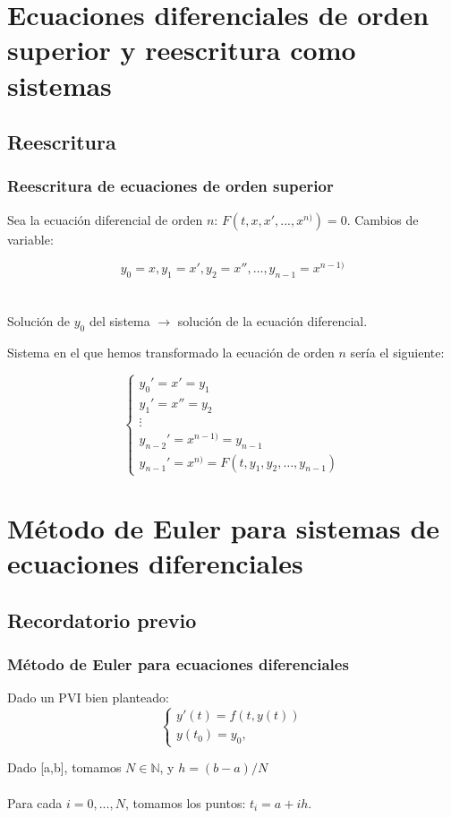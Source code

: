 \documentclass{beamer}
\begin{document}
\section{Ecuaciones diferenciales de orden superior y reescritura como sistemas}
\subsection{Reescritura}
\begin{frame}
	\frametitle{Reescritura de ecuaciones de orden superior}

	Sea la ecuación diferencial de orden $n$: $ F(t, x, x', ..., x^{n)}) = 0 $. Cambios de variable:

	$$y_0 = x, y_1 = x', y_2 = x'', \dots, y_{n-1} = x^{n-1)}$$\\~\\

	Solución de $y_0$ del sistema $\rightarrow$ solución de la ecuación diferencial.

\end{frame}

\begin{frame}
	
	Sistema en el que hemos transformado la ecuación de orden $n$ sería el siguiente:
	
	$$
	\begin{cases}
	y_0' = x' = y_1\\
	y_1' = x'' = y_2\\
	\vdots\\
	y_{n-2}' = x^{n-1)} = y_{n-1}\\
	y_{n-1}' = x^{n)} = F(t, y_1, y_2, \dots, y_{n-1})
	\end{cases}
	$$
	
\end{frame}

\section{Método de Euler para sistemas de ecuaciones diferenciales}
\subsection{Recordatorio previo}
\begin{frame}
	\frametitle{Método de Euler para ecuaciones diferenciales}
	
	Dado un PVI bien planteado:
	$$
	\begin{cases}
	y'(t)=f(t,y(t)) \\ 
	y(t_0)=y_0, 
	\end{cases}
	$$
	
	Dado [a,b], tomamos $N \in \mathbb{N}$, y $h=(b-a)/N$\\~\\
	Para cada $i=0,...,N$, tomamos los puntos: $t_i=a+ih$.
	
\end{frame}
\end{document}
